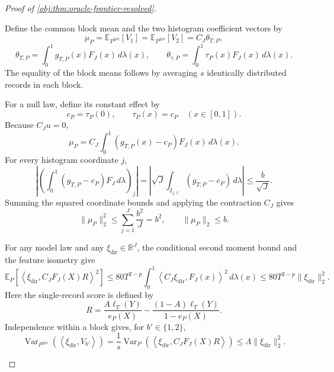 \begin{proof}[Proof of \cref{obj:thm:oracle-frontier-resolved}]
\begin{enumerate}
Define the common block mean and the two histogram coefficient vectors by
\[
\mu_P=\mathbb E_{P^{\otimes n}}[V_1]
=\mathbb E_{P^{\otimes n}}[V_2]
=C_J\theta_{T,P},
\]
\[
\theta_{T,P}=\int_0^1g_{T,P}(x)F_J(x)\,d\lambda(x),
\qquad
\theta_{\tau,P}=\int_0^1\tau_P(x)F_J(x)\,d\lambda(x).
\]
The equality of the block means follows by averaging \(s\) identically distributed records in each block.

For a null law, define its constant effect by
\[
c_P=\tau_P(0),\qquad \tau_P(x)=c_P\quad(x\in[0,1]).
\]
Because \(C_Ju=0\),
\[
\mu_P=C_J\int_0^1(g_{T,P}(x)-c_P)F_J(x)\,d\lambda(x).
\]
For every histogram coordinate \(j\),
\[
\left|
\left(\int_0^1(g_{T,P}-c_P)F_J\,d\lambda\right)_j
\right|
=
\left|\sqrt J\int_{I_{j,J}}(g_{T,P}-c_P)\,d\lambda\right|
\le\frac b{\sqrt J}.
\]
Summing the squared coordinate bounds and applying the contraction \(C_J\) gives
\[
\|\mu_P\|_2^2
\le\sum_{j=1}^{J}\frac{b^2}{J}=b^2,
\qquad
\|\mu_P\|_2\le b.
\]

For any model law and any \(\xi_{\mathrm{dir}}\in\mathbb R^J\), the conditional second moment bound and the feature isometry give
\[
\mathbb E_P\!\left[
\left\langle\xi_{\mathrm{dir}},C_JF_J(X)R\right\rangle^2
\right]
\le80T^{2-p}\int_0^1
\left\langle C_J\xi_{\mathrm{dir}},F_J(x)\right\rangle^2\,d\lambda(x)
\le80T^{2-p}\|\xi_{\mathrm{dir}}\|_2^2.
\]
Here the single-record score is defined by
\[
R=\frac{A\ell_T(Y)}{e_P(X)}
-\frac{(1-A)\ell_T(Y)}{1-e_P(X)}.
\]
Independence within a block gives, for \(b'\in\{1,2\}\),
\[
\operatorname{Var}_{P^{\otimes n}}
\!\left(\left\langle\xi_{\mathrm{dir}},V_{b'}\right\rangle\right)
=
\frac1s\operatorname{Var}_P
\!\left(\left\langle\xi_{\mathrm{dir}},C_JF_J(X)R\right\rangle\right)
\le\Lambda\|\xi_{\mathrm{dir}}\|_2^2.
\]


\end{enumerate}
\end{proof}
